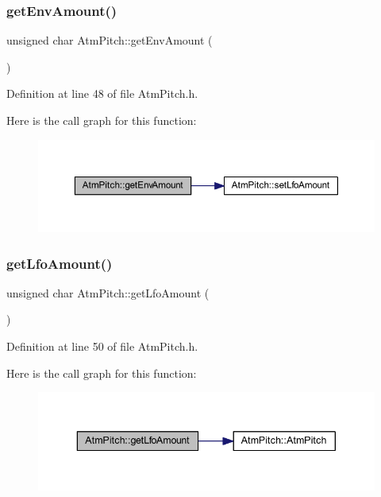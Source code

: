 \subsubsection{\texorpdfstring{get\+Env\+Amount()}{getEnvAmount()}}
{\footnotesize\ttfamily unsigned char Atm\+Pitch\+::get\+Env\+Amount (\begin{DoxyParamCaption}{ }\end{DoxyParamCaption})\hspace{0.3cm}{\ttfamily [inline]}}



Definition at line 48 of file Atm\+Pitch.\+h.

Here is the call graph for this function\+:
\nopagebreak
\begin{figure}[H]
\begin{center}
\leavevmode
\includegraphics[width=350pt]{class_atm_pitch_a850e1e507b70bc3a12049d48cd65283f_cgraph}
\end{center}
\end{figure}
\mbox{\label{class_atm_pitch_ace9d80c3de42d8e0920e6d23cf753dcc}} 
\subsubsection{\texorpdfstring{get\+Lfo\+Amount()}{getLfoAmount()}}
{\footnotesize\ttfamily unsigned char Atm\+Pitch\+::get\+Lfo\+Amount (\begin{DoxyParamCaption}{ }\end{DoxyParamCaption})\hspace{0.3cm}{\ttfamily [inline]}}



Definition at line 50 of file Atm\+Pitch.\+h.

Here is the call graph for this function\+:
\nopagebreak
\begin{figure}[H]
\begin{center}
\leavevmode
\includegraphics[width=343pt]{class_atm_pitch_ace9d80c3de42d8e0920e6d23cf753dcc_cgraph}
\end{center}
\end{figure}
\mbox{\label{class_atm_pitch_a30b8bb597d3f1ce75a0394d2dd510004}} 
